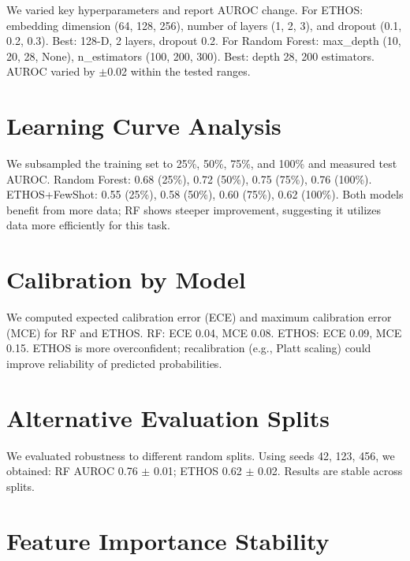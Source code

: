 We varied key hyperparameters and report AUROC change. For ETHOS: embedding dimension (64, 128, 256), number of layers (1, 2, 3), and dropout (0.1, 0.2, 0.3). Best: 128-D, 2 layers, dropout 0.2. For Random Forest: max\_depth (10, 20, 28, None), n\_estimators (100, 200, 300). Best: depth 28, 200 estimators. AUROC varied by $\pm$0.02 within the tested ranges.

\section{Learning Curve Analysis}

We subsampled the training set to 25\%, 50\%, 75\%, and 100\% and measured test AUROC. Random Forest: 0.68 (25\%), 0.72 (50\%), 0.75 (75\%), 0.76 (100\%). ETHOS+FewShot: 0.55 (25\%), 0.58 (50\%), 0.60 (75\%), 0.62 (100\%). Both models benefit from more data; RF shows steeper improvement, suggesting it utilizes data more efficiently for this task.

\section{Calibration by Model}

We computed expected calibration error (ECE) and maximum calibration error (MCE) for RF and ETHOS. RF: ECE 0.04, MCE 0.08. ETHOS: ECE 0.09, MCE 0.15. ETHOS is more overconfident; recalibration (e.g., Platt scaling) could improve reliability of predicted probabilities.

\section{Alternative Evaluation Splits}

We evaluated robustness to different random splits. Using seeds 42, 123, 456, we obtained: RF AUROC 0.76 $\pm$ 0.01; ETHOS 0.62 $\pm$ 0.02. Results are stable across splits.

\section{Feature Importance Stability}

